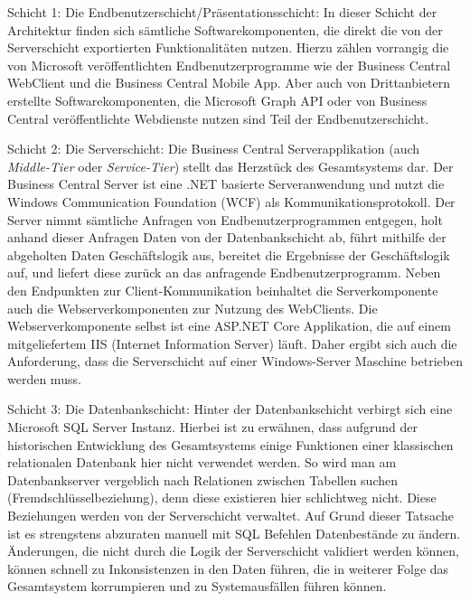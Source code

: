 \pagebreak

Schicht 1: Die Endbenutzerschicht/Präsentationsschicht: 
In dieser Schicht der Architektur finden sich sämtliche Softwarekomponenten, die direkt die von der Serverschicht exportierten Funktionalitäten nutzen. Hierzu zählen vorrangig die von Microsoft veröffentlichten Endbenutzerprogramme wie der Business Central WebClient und die Business Central Mobile App. Aber auch von Drittanbietern erstellte Softwarekomponenten, die Microsoft Graph API oder von Business Central veröffentlichte Webdienste nutzen sind Teil der Endbenutzerschicht.
\linebreak

Schicht 2: Die Serverschicht: 
Die Business Central Serverapplikation (auch \textit{Middle-Tier} oder \textit{Service-Tier}) stellt das Herzstück des Gesamtsystems dar. Der Business Central Server ist eine .NET basierte Serveranwendung und nutzt die Windows Communication Foundation (WCF) als Kommunikationsprotokoll. Der Server nimmt sämtliche Anfragen von Endbenutzerprogrammen entgegen, holt anhand dieser Anfragen Daten von der Datenbankschicht ab, führt mithilfe der abgeholten Daten Geschäftslogik aus, bereitet die Ergebnisse der Geschäftslogik auf, und liefert diese zurück an das anfragende Endbenutzerprogramm. Neben den Endpunkten zur Client-Kommunikation beinhaltet die Serverkomponente auch die Webserverkomponenten zur Nutzung des WebClients. Die Webserverkomponente selbst ist eine ASP.NET Core Applikation, die auf einem mitgeliefertem IIS (Internet Information Server) läuft. Daher ergibt sich auch die Anforderung, dass die Serverschicht auf einer Windows-Server Maschine betrieben werden muss.
\linebreak

Schicht 3: Die Datenbankschicht:
Hinter der Datenbankschicht verbirgt sich eine Microsoft SQL Server Instanz. Hierbei ist zu erwähnen, dass aufgrund der historischen Entwicklung des Gesamtsystems einige Funktionen einer klassischen relationalen Datenbank hier nicht verwendet werden. So wird man am Datenbankserver vergeblich nach Relationen zwischen Tabellen suchen (Fremdschlüsselbeziehung), denn diese existieren hier schlichtweg nicht. Diese Beziehungen werden von der Serverschicht verwaltet. Auf Grund dieser Tatsache ist es strengstens abzuraten manuell mit SQL Befehlen Datenbestände zu ändern. Änderungen, die nicht durch die Logik der Serverschicht validiert werden können, können schnell zu Inkonsistenzen in den Daten führen, die in weiterer Folge das Gesamtsystem korrumpieren und zu Systemausfällen führen können. 
\linebreak

